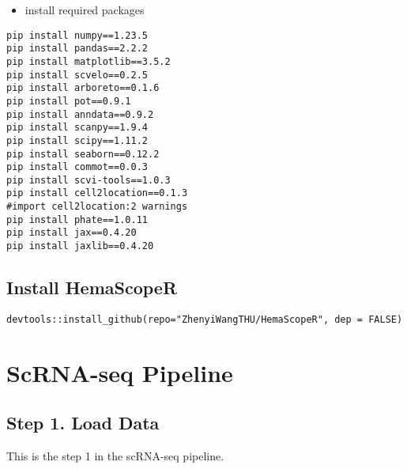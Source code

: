 \documentclass[
]{book}
\providecommand{\tightlist}{%
  \setlength{\itemsep}{0pt}\setlength{\parskip}{0pt}}
\begin{document}
\begin{itemize}
\tightlist
\item
  install required packages
\end{itemize}

\begin{verbatim}
pip install numpy==1.23.5
pip install pandas==2.2.2
pip install matplotlib==3.5.2
pip install scvelo==0.2.5
pip install arboreto==0.1.6
pip install pot==0.9.1
pip install anndata==0.9.2
pip install scanpy==1.9.4
pip install scipy==1.11.2
pip install seaborn==0.12.2
pip install commot==0.0.3
pip install scvi-tools==1.0.3
pip install cell2location==0.1.3 
#import cell2location:2 warnings
pip install phate==1.0.11
pip install jax==0.4.20
pip install jaxlib==0.4.20
\end{verbatim}

\hypertarget{install-hemascoper}{%
\section{Install HemaScopeR}\label{install-hemascoper}}

\begin{verbatim}
devtools::install_github(repo="ZhenyiWangTHU/HemaScopeR", dep = FALSE)
\end{verbatim}

\hypertarget{scrna-seq-pipeline}{%
\chapter{ScRNA-seq Pipeline}\label{scrna-seq-pipeline}}

\hypertarget{step-1.-load-data}{%
\section{Step 1. Load Data}\label{step-1.-load-data}}

This is the step 1 in the scRNA-seq pipeline.

  
\end{document}
